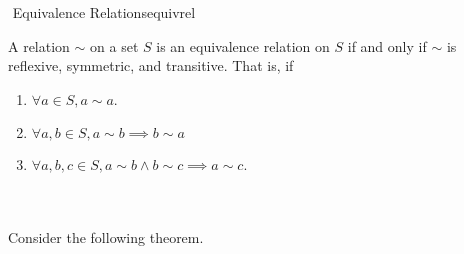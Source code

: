     \begin{definition}{\Stop\,\,Equivalence Relations}{equivrel}
        
        A relation \(\sim\) on a set \(S\) is an equivalence relation on \(S\) if and only if \(\sim\) is reflexive, symmetric, and transitive. That is, if
        \begin{enumerate}
            \item \(\forall a\in S, a\sim a\).
            \item \(\forall a, b\in S, a\sim b\implies b\sim a\)
            \item \(\forall a, b, c\in S, a\sim b\wedge b\sim c\implies a\sim c\).
        \end{enumerate}
        
    \end{definition}
    \pagebreak
    \vphantom
    \\
    \\
    Consider the following theorem.
